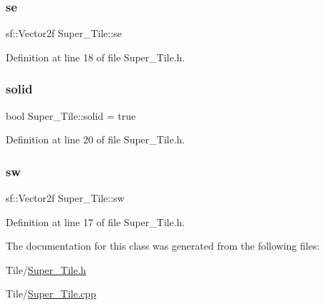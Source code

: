 \subsubsection{\texorpdfstring{se}{se}}
{\footnotesize\ttfamily sf\+::\+Vector2f Super\+\_\+\+Tile\+::se}



Definition at line 18 of file Super\+\_\+\+Tile.\+h.

\hypertarget{class_super___tile_af486363a0321c167562c54da0f04884c}{}\label{class_super___tile_af486363a0321c167562c54da0f04884c} 
\subsubsection{\texorpdfstring{solid}{solid}}
{\footnotesize\ttfamily bool Super\+\_\+\+Tile\+::solid = true}



Definition at line 20 of file Super\+\_\+\+Tile.\+h.

\hypertarget{class_super___tile_abe9efe0c3d1ed440395225843435dfc8}{}\label{class_super___tile_abe9efe0c3d1ed440395225843435dfc8} 
\subsubsection{\texorpdfstring{sw}{sw}}
{\footnotesize\ttfamily sf\+::\+Vector2f Super\+\_\+\+Tile\+::sw}



Definition at line 17 of file Super\+\_\+\+Tile.\+h.



The documentation for this class was generated from the following files\+:\begin{DoxyCompactItemize}
\item 
Tile/\hyperlink{_super___tile_8h}{Super\+\_\+\+Tile.\+h}\item 
Tile/\hyperlink{_super___tile_8cpp}{Super\+\_\+\+Tile.\+cpp}\end{DoxyCompactItemize}
